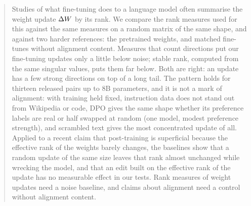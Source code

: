 \begin{abstract}
Studies of what fine-tuning does to a language model often summarise the
weight update $\dW$ by its rank. We compare the rank measures used for this
against the same measures on a random matrix of the same shape, and against
two harder references: the pretrained weights, and matched fine-tunes
without alignment content. Measures that count directions put our
fine-tuning updates only a little below noise; stable rank, computed from
the same singular values, puts them far below. Both are right: an update has
a few strong directions on top of a long tail. The pattern holds for thirteen
released pairs up to 8B parameters, and it is not a mark of alignment: with
training held fixed, instruction data does not stand out from Wikipedia or
code, DPO gives the same shape whether its preference labels are real or
half swapped at random (one model, modest preference strength), and
scrambled text gives the most concentrated update of all. Applied to a recent
claim that post-training is superficial because the effective rank of the
weights barely changes, the baselines show that a random update of the same
size leaves that rank almost unchanged while wrecking the model, and that an
edit built on the effective rank of the update has no measurable effect in
our tests. Rank measures of weight updates need a noise baseline, and claims
about alignment need a control without alignment content.
\end{abstract}
